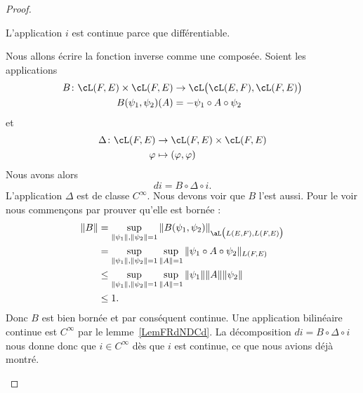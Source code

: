 \begin{proof}
\begin{subproof}

		L'application \( i\) est continue parce que différentiable.

		Nous allons écrire la fonction inverse comme une composée. Soient les applications
		\begin{equation}
			\begin{aligned}
				B\colon \cL(F,E)\times \cL(F,E) & \to \cL\big( \cL(E,F),\cL(F,E) \big) \\
				B(\psi_1,\psi_2)(A)             & = -\psi_1\circ A\circ\psi_2
			\end{aligned}
		\end{equation}
		et
		\begin{equation}
			\begin{aligned}
				\Delta\colon \cL(F,E) & \to \cL(F,E)\times \cL(F,E) \\
				\varphi               & \mapsto (\varphi,\varphi)
			\end{aligned}
		\end{equation}
		Nous avons alors
		\begin{equation}
			di=B\circ\Delta\circ i.
		\end{equation}
		L'application \( \Delta\) est de classe \(  C^{\infty}\). Nous devons voir que \( B\) l'est aussi. Pour le voir nous commençons par prouver qu'elle est bornée :
		\begin{equation}
			\begin{aligned}[]
				\| B \| & =\sup_{\| \psi_1 \|,\| \psi_2 \|=1}\| B(\psi_1,\psi_2) \|_{\aL\big( L(E,F),L(F,E) \big)}      \\
				        & =\sup_{  \| \psi_1 \|,\| \psi_2 \|=1 }\sup_{\| A \|=1}\| \psi_1\circ A\circ\psi_2 \|_{L(F,E)} \\
				        & \leq \sup_{\| \psi_1 \|,\| \psi_2 \|=1}\sup_{\| A \|=1}\| \psi_1 \|\| A \|\| \psi_2 \|        \\
				        & \leq 1.
			\end{aligned}
		\end{equation}
		Donc \( B\) est bien bornée et par conséquent continue. Une application bilinéaire continue est \(  C^{\infty}\) par le lemme~\ref{LemFRdNDCd}. La décomposition \( di=B\circ \Delta\circ i\) nous donne donc que \( i\in C^{\infty}\) dès que \( i\) est continue, ce que nous avions déjà montré.
	\end{subproof}
\end{proof}

